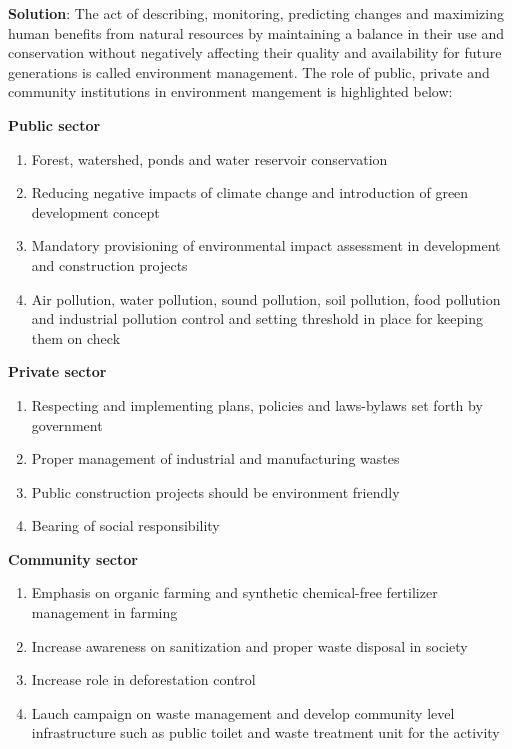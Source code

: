 \documentclass[
  openany]{book}
\newenvironment{solution}{ {\bfseries Solution}:}{}
\begin{document}
\begin{questions}
\begin{solution}
The act of describing, monitoring, predicting changes and maximizing human benefits from natural resources by maintaining a balance in their use and conservation without negatively affecting their quality and availability for future generations is called environment management. The role of public, private and community institutions in environment mangement is highlighted below:

\textbf{Public sector}

\begin{enumerate}
\item Forest, watershed, ponds and water reservoir conservation
\item Reducing negative impacts of climate change and introduction of green development concept
\item Mandatory provisioning of environmental impact assessment in development and construction projects
\item Air pollution, water pollution, sound pollution, soil pollution, food pollution and industrial pollution control and setting threshold in place for keeping them on check
\end{enumerate}

\textbf{Private sector}

\begin{enumerate}
\item Respecting and implementing plans, policies and laws-bylaws set forth by government
\item Proper management of industrial and manufacturing wastes
\item Public construction projects should be environment friendly
\item Bearing of social responsibility
\end{enumerate}

\textbf{Community sector}
\begin{enumerate}
\item Emphasis on organic farming and synthetic chemical-free fertilizer management in farming
\item Increase awareness on sanitization and proper waste disposal in society
\item Increase role in deforestation control
\item Lauch campaign on waste management and develop community level infrastructure such as public toilet and waste treatment unit for the activity
\end{enumerate}


\end{solution}
\end{questions}
\end{document}
